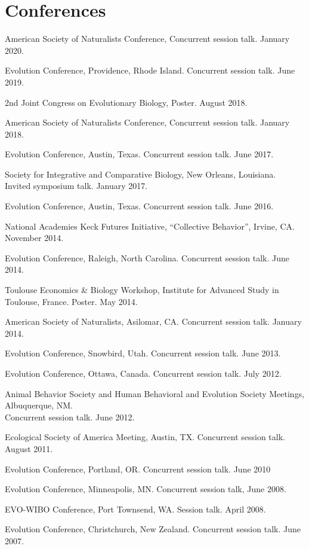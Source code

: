 \documentclass[11pt]{article}
\begin{document}
  \section{Conferences}

  \begin{compactlist}
  \item American Society of Naturalists Conference, Concurrent session talk. January 2020.
  \item Evolution Conference, Providence, Rhode Island. Concurrent session talk. June 2019.
  \item 2nd Joint Congress on Evolutionary Biology, Poster. August 2018.
  \item American Society of Naturalists Conference, Concurrent session talk. January 2018.
  \item Evolution Conference, Austin, Texas. Concurrent session talk. June 2017.
  \item Society for Integrative and Comparative Biology, New Orleans, Louisiana.\\
    Invited symposium talk. January 2017.
  \item Evolution Conference, Austin, Texas. Concurrent session talk. June 2016.
  \item National Academies Keck Futures Initiative, ``Collective Behavior'', Irvine, CA. November 2014.
  \item Evolution Conference, Raleigh, North Carolina. Concurrent session talk. June 2014.
  \item Toulouse Economics \& Biology Workshop, Institute for Advanced Study in Toulouse, France. Poster. May 2014.
  \item American Society of Naturalists, Asilomar, CA. Concurrent session talk. January 2014.
  \item Evolution Conference, Snowbird, Utah. Concurrent session talk. June 2013.
  \item Evolution Conference, Ottawa, Canada. Concurrent session talk. July 2012.
  \item Animal Behavior Society and Human Behavioral and Evolution Society Meetings, Albuquerque, NM.  \\
    Concurrent session talk.  June 2012.
  \item Ecological Society of America Meeting, Austin, TX. Concurrent session talk. August 2011.
  \item Evolution Conference, Portland, OR. Concurrent session talk. June 2010
  \item Evolution Conference, Minneapolis, MN. Concurrent session talk, June 2008.
  \item EVO-WIBO Conference, Port Townsend, WA. Session talk. April 2008. 
  \item Evolution Conference, Christchurch, New Zealand. Concurrent session talk. June 2007. 
  \end{compactlist}
  
\end{document}
